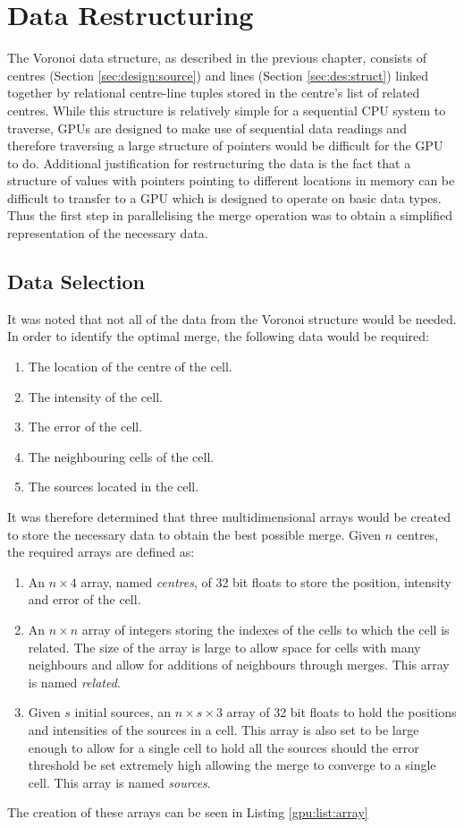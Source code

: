 \section{Data Restructuring}
The Voronoi data structure, as described in the previous chapter, consists of centres (Section \ref{sec:design:source}) and lines (Section \ref{sec:des:struct}) linked together by relational centre-line tuples stored in the centre's  list of related centres. While this structure is relatively simple for a sequential CPU system to traverse, GPUs are designed to make use of sequential data readings and therefore traversing a large structure of pointers would be difficult for the GPU to do. Additional justification for restructuring the data is the fact that a structure of values with pointers pointing to different locations in memory can be difficult to transfer to a GPU which is designed to operate on basic data types. Thus the first step in parallelising the merge operation was to obtain a simplified representation of the necessary data.
\subsection{Data Selection}
It was noted that not all of the data from the Voronoi structure would be needed. In order to identify the optimal merge, the following data would be required:
\begin{enumerate}
\item The location of the centre of the cell.
\item The intensity of the cell.
\item The error of the cell.
\item The neighbouring cells of the cell.
\item The sources located in the cell.
\end{enumerate}
It was therefore determined that three multidimensional arrays would be created to store the necessary data to obtain the best possible merge. Given $n$ centres, the required arrays are defined as:
\begin{enumerate}
\item An $n \times 4$ array, named \textit{centres}, of 32 bit floats to store the position, intensity and error of the cell.
\item An $n \times n$ array of integers storing the indexes of the cells to which the cell is related. The size of the array is large to allow space for cells with many neighbours and allow for additions of neighbours through merges. This array is named \textit{related}.
\item Given $s$ initial sources, an $n \times s \times 3$ array of 32 bit floats to hold the positions and intensities of the sources in a cell. This array is also set to be large enough to allow for a single cell to hold all the sources should the error threshold be set extremely high allowing the merge to converge to a single cell. This array is named \textit{sources}.
\end{enumerate}
The creation of these arrays can be seen in Listing \ref{gpu:list:array}

